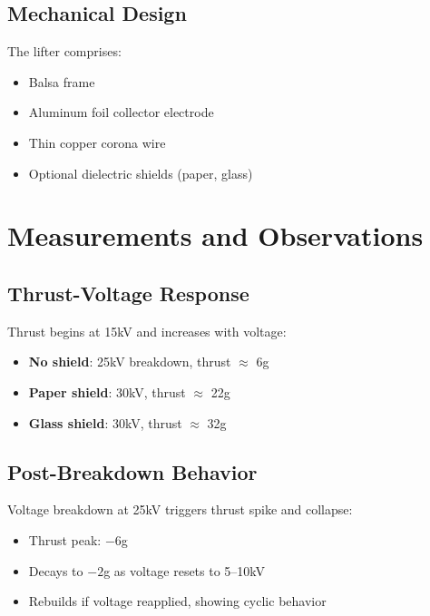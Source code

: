 
\subsection{Mechanical Design}
The lifter comprises:
\begin{itemize}
    \item Balsa frame
    \item Aluminum foil collector electrode
    \item Thin copper corona wire
    \item Optional dielectric shields (paper, glass)
\end{itemize}


\section{Measurements and Observations}
\subsection{Thrust-Voltage Response}
Thrust begins at 15kV and increases with voltage:
\begin{itemize}
    \item \textbf{No shield}: 25kV breakdown, thrust $\approx$ 6g
    \item \textbf{Paper shield}: 30kV, thrust $\approx$ 22g
    \item \textbf{Glass shield}: 30kV, thrust $\approx$ 32g
\end{itemize}


\subsection{Post-Breakdown Behavior}
Voltage breakdown at 25kV triggers thrust spike and collapse:
\begin{itemize}
    \item Thrust peak: $-6$g
    \item Decays to $-2$g as voltage resets to 5--10kV
    \item Rebuilds if voltage reapplied, showing cyclic behavior
\end{itemize}

